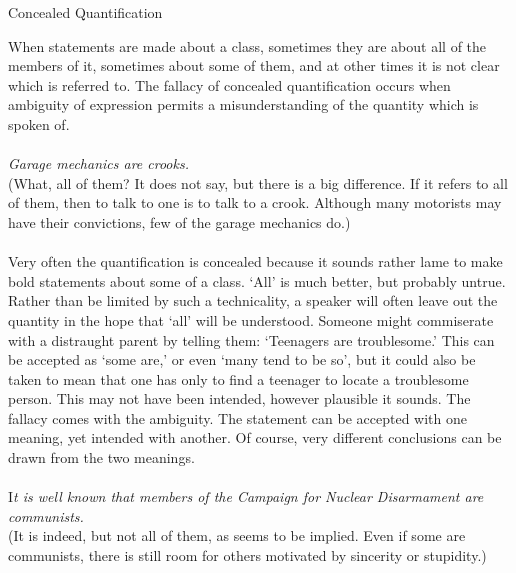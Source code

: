 \documentclass[a4paper,12pt,single,pdftex]{scrartcl}
\begin{document}
Concealed Quantification
    
      When statements are made about a class, sometimes they are about all of the members of it, sometimes about some of them, and at other times it is not clear which is referred to. The fallacy of concealed quantification occurs when ambiguity of expression permits a misunderstanding of the quantity which is spoken of.
    \\

    
       
    \\

    
      {\em Garage mechanics are crooks.}
    \\

    
      (What, all of them? It does not say, but there is a big difference. If it refers to all of them, then to talk to one is to talk to a crook. Although many motorists may have their convictions, few of the garage mechanics do.)
    \\

    
       
    \\

    
      Very often the quantification is concealed because it sounds rather lame to make bold statements about some of a class. ‘All’ is much better, but probably untrue. Rather than be limited by such a technicality, a speaker will often leave out the quantity in the hope that ‘all’ will be understood. Someone might commiserate with a distraught parent by telling them: ‘Teenagers are troublesome.’ This can be accepted as ‘some are,’ or even ‘many tend to be so’, but it could also be taken to mean that one has only to find a teenager to locate a troublesome person. This may not have been intended, however plausible it sounds. The fallacy comes with the ambiguity. The statement can be accepted with one meaning, yet intended with another. Of course, very different conclusions can be drawn from the two meanings.
    \\

    
       
    \\

    
      I{\em t is well known that members of the Campaign for Nuclear Disarmament are communists.}
    \\

    
      (It is indeed, but not all of them, as seems to be implied. Even if some are communists, there is still room for others motivated by sincerity or stupidity.)
    \\
\end{document}
